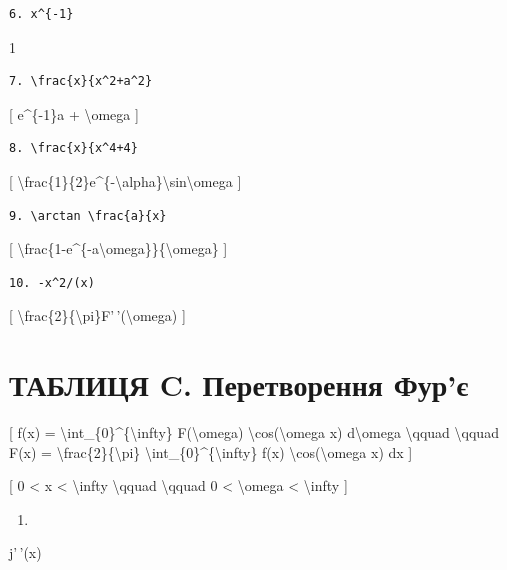 \documentclass[
]{article}
\providecommand{\tightlist}{%
  \setlength{\itemsep}{0pt}\setlength{\parskip}{0pt}}
\begin{document}
{\begin{verbatim}
6. x^{-1}
\end{verbatim}

1

\begin{verbatim}
7. \frac{x}{x^2+a^2}
\end{verbatim}

{[} e\^{}\{-1\}a + \textbackslash omega {]}

\begin{verbatim}
8. \frac{x}{x^4+4}
\end{verbatim}

{[}
\textbackslash frac\{1\}\{2\}e\^{}\{-\textbackslash alpha\}\textbackslash sin\textbackslash omega
{]}

\begin{verbatim}
9. \arctan \frac{a}{x}
\end{verbatim}

{[}
\textbackslash frac\{1-e\^{}\{-a\textbackslash omega\}\}\{\textbackslash omega\}
{]}

\begin{verbatim}
10. -x^2/(x)
\end{verbatim}

{[}
\textbackslash frac\{2\}\{\textbackslash pi\}F'\,'(\textbackslash omega)
{]}

\section{ТАБЛИЦЯ C. Перетворення
Фур'є}\label{ux442ux430ux431ux43bux438ux446ux44f-c.-ux43fux435ux440ux435ux442ux432ux43eux440ux435ux43dux43dux44f-ux444ux443ux440ux454}

{[} f(x) = \textbackslash int\_\{0\}\^{}\{\textbackslash infty\}
F(\textbackslash omega) \textbackslash cos(\textbackslash omega x)
d\textbackslash omega \textbackslash qquad \textbackslash qquad F(x) =
\textbackslash frac\{2\}\{\textbackslash pi\}
\textbackslash int\_\{0\}\^{}\{\textbackslash infty\} f(x)
\textbackslash cos(\textbackslash omega x) dx {]}

{[} 0 \textless{} x \textless{} \textbackslash infty
\textbackslash qquad \textbackslash qquad 0 \textless{}
\textbackslash omega \textless{} \textbackslash infty {]}

\begin{enumerate}
\def\labelenumi{\arabic{enumi}.}
\tightlist
\item
\end{enumerate}

j'\,'(x)

}
\end{document}
